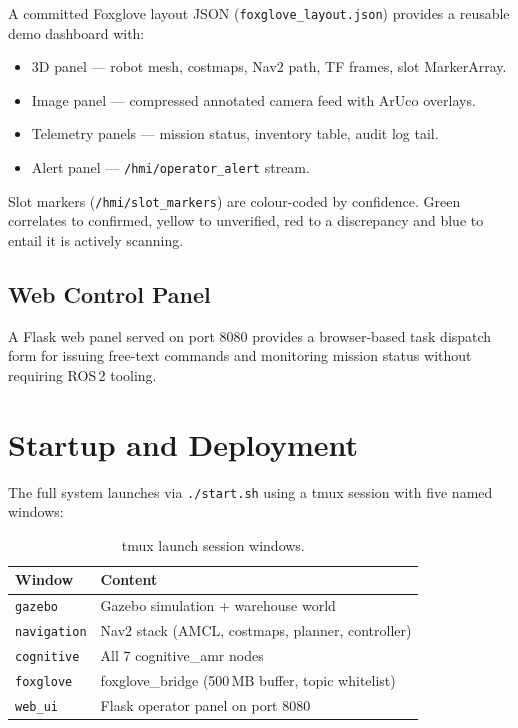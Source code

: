 \documentclass[12pt,a4paper]{report}
\begin{document}
A committed Foxglove layout JSON (\texttt{foxglove\_layout.json}) provides a reusable demo dashboard with:

\begin{itemize}
    \item 3D panel — robot mesh, costmaps, Nav2 path, TF frames, slot MarkerArray.
    \item Image panel — compressed annotated camera feed with ArUco overlays.
    \item Telemetry panels — mission status, inventory table, audit log tail.
    \item Alert panel — \texttt{/hmi/operator\_alert} stream.
\end{itemize}

Slot markers (\texttt{/hmi/slot\_markers}) are colour-coded by confidence. Green correlates to confirmed, yellow to unverified, red to a discrepancy and blue to entail it is actively scanning.

\subsection{Web Control Panel}

A Flask web panel served on port 8080 provides a browser-based task dispatch form for issuing free-text commands and monitoring mission status without requiring ROS\,2 tooling.

\section{Startup and Deployment}
\label{sec:startup}

The full system launches via \texttt{./start.sh} using a tmux session with five named windows:

\begin{table}[H]
\centering
\caption{tmux launch session windows.}
\begin{tabular}{ll}
\toprule
\textbf{Window} & \textbf{Content} \\
\midrule
\texttt{gazebo}     & Gazebo simulation + warehouse world \\
\texttt{navigation} & Nav2 stack (AMCL, costmaps, planner, controller) \\
\texttt{cognitive}  & All 7 cognitive\_amr nodes \\
\texttt{foxglove}   & foxglove\_bridge (500\,MB buffer, topic whitelist) \\
\texttt{web\_ui}    & Flask operator panel on port 8080 \\
\bottomrule
\end{tabular}
\end{table}
\end{document}
